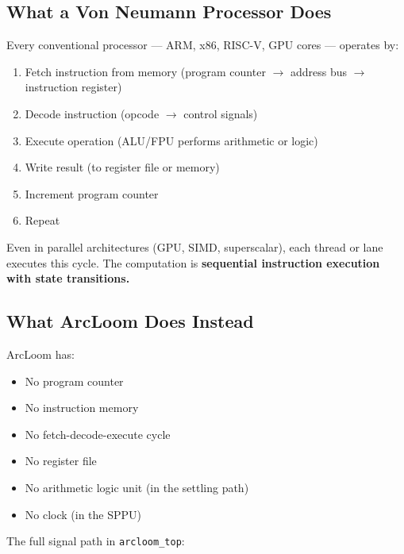 \documentclass[11pt,a4paper]{article}
\begin{document}
\subsection{What a Von Neumann Processor Does}

Every conventional processor --- ARM, x86, RISC-V, GPU cores --- operates by:
\begin{enumerate}
    \item Fetch instruction from memory (program counter $\rightarrow$ address bus $\rightarrow$ instruction register)
    \item Decode instruction (opcode $\rightarrow$ control signals)
    \item Execute operation (ALU/FPU performs arithmetic or logic)
    \item Write result (to register file or memory)
    \item Increment program counter
    \item Repeat
\end{enumerate}

Even in parallel architectures (GPU, SIMD, superscalar), each thread or lane executes this cycle. The computation is \textbf{sequential instruction execution with state transitions.}

\subsection{What ArcLoom Does Instead}

ArcLoom has:
\begin{itemize}
    \item No program counter
    \item No instruction memory
    \item No fetch-decode-execute cycle
    \item No register file
    \item No arithmetic logic unit (in the settling path)
    \item No clock (in the SPPU)
\end{itemize}

The full signal path in \texttt{arcloom\_top}:
\end{document}
